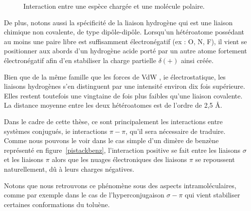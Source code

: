 {{\begin{figure}[h]
\centering
{}
\caption{Interaction entre une espèce chargée et une molécule polaire.}
\label{figiondipole}
\end{figure}

De plus, notons aussi la spécificité de la liaison hydrogène qui est une liaison chimique non covalente, de type dipôle-dipôle. Lorsqu'un hétéroatome possédant au moins une paire libre est suffisamment électronégatif (ex : O, N, F), il vient se positionner aux abords d'un hydrogène acide porté par un autre atome fortement électronégatif afin d'en stabiliser la charge partielle $\delta (+)$ ainsi créée.

Bien que de la même famille que les forces de VdW , ie électrostatique, les liaisons hydrogènes s'en distinguent par une intensité environ dix fois supérieure. Elles restent toutefois une vingtaine de fois plus faibles qu'une liaison covalente. La distance moyenne entre les deux hétéroatomes est de l'ordre de 2,5 \AA .

Dans le cadre de cette thèse, ce sont principalement les interactions entre systèmes conjugués, ie interactions $\pi-\pi$, qu'il sera nécessaire de traduire. Comme nous pouvons le voir dans le cas simple d'un dimère de benzène représenté en figure~\ref{pistackbenz}, l'interaction positive se fait entre les liaisons $\sigma$ et les liaisons $\pi$ alors que les nuages électroniques des liaisons $\pi$ se repoussent naturellement, dû à leurs charges négatives.

Notons que nous retrouvons ce phénomène sous des aspects intramoléculaires, comme par exemple dans le cas de l'hyperconjugaison $\sigma-\pi$ qui vient stabiliser certaines conformations du toluène.

}}
